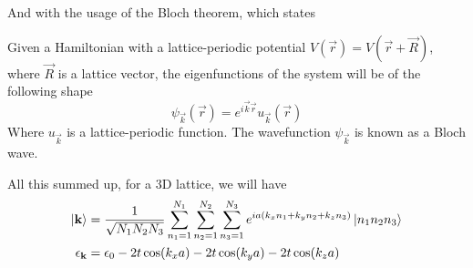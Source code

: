 \documentclass[../qm.tex]{subfiles}
\begin{document}
And with the usage of the Bloch theorem, which states
\begin{thm}
	Given a Hamiltonian with a lattice-periodic potential $V(\vec{r})=V(\vec{r}+\vec{R})$, where $\vec{R}$ is a lattice vector, the eigenfunctions of the system will be of the following shape
	\begin{equation}
		\psi_{\vec{k}}(\vec{r})=e^{i\vec{k}\vec{r}}u_{\vec{k}}(\vec{r})
		\label{eq:blochwave}
	\end{equation}
	Where $u_{\vec{k}}$ is a lattice-periodic function. The wavefunction $\psi_{\vec{k}}$ is known as a Bloch wave.
\end{thm}
All this summed up, for a 3D lattice, we will have
\begin{equation}
	\begin{aligned}
		\ket{\mathbf{k}}&=\frac{1}{\sqrt{N_1N_2N_3}}\sum_{n_1=1}^{N_1}\sum_{n_2=1}^{N_2}\sum_{n_3=1}^{N_3}e^{ia(k_xn_1+k_yn_2+k_zn_3)}\ket{n_1n_2n_3}\\
		\epsilon_{\mathbf{k}}&=\epsilon_0-2t\cos(k_xa)-2t\cos(k_ya)-2t\cos(k_za)
	\end{aligned}
	\label{eq:cubiclattice}
\end{equation}
\end{document}
